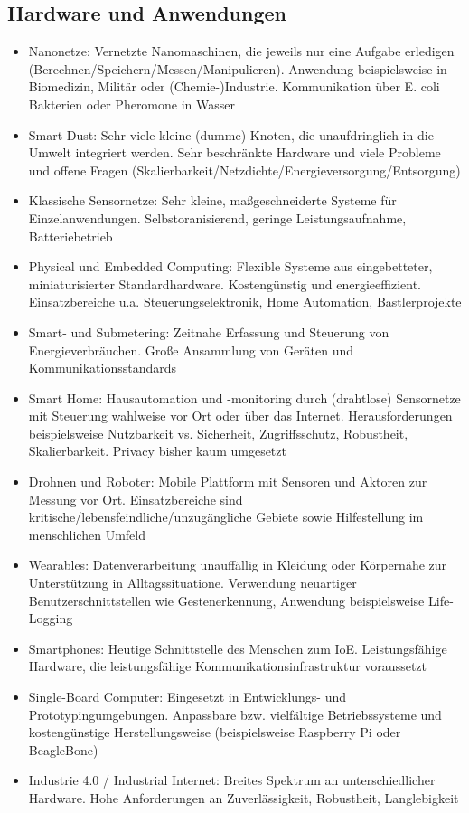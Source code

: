 \subsection{Hardware und Anwendungen}
\begin{itemize}
	\item Nanonetze: Vernetzte Nanomaschinen, die jeweils nur eine Aufgabe erledigen (Berechnen/Speichern/Messen/Manipulieren). Anwendung beispielsweise in Biomedizin, Militär oder (Chemie-)Industrie. Kommunikation über E. coli Bakterien oder Pheromone in Wasser
	\item Smart Dust: Sehr viele kleine (dumme) Knoten, die unaufdringlich in die Umwelt integriert werden. Sehr beschränkte Hardware und viele Probleme und offene Fragen (Skalierbarkeit/Netzdichte/Energieversorgung/Entsorgung)
	\item Klassische Sensornetze: Sehr kleine, maßgeschneiderte Systeme für Einzelanwendungen. Selbstoranisierend, geringe Leistungsaufnahme, Batteriebetrieb
	\item Physical und Embedded Computing: Flexible Systeme aus eingebetteter, miniaturisierter Standardhardware. Kostengünstig und energieeffizient. Einsatzbereiche u.a. Steuerungselektronik, Home Automation, Bastlerprojekte
	\item Smart- und Submetering: Zeitnahe Erfassung und Steuerung von Energieverbräuchen. Große Ansammlung von Geräten und Kommunikationsstandards
	\item Smart Home: Hausautomation und -monitoring durch (drahtlose) Sensornetze mit Steuerung wahlweise vor Ort oder über das Internet. Herausforderungen beispielsweise Nutzbarkeit vs. Sicherheit, Zugriffsschutz, Robustheit, Skalierbarkeit. Privacy bisher kaum umgesetzt
	\item Drohnen und Roboter: Mobile Plattform mit Sensoren und Aktoren zur Messung vor Ort. Einsatzbereiche sind kritische/lebensfeindliche/unzugängliche Gebiete sowie Hilfestellung im menschlichen Umfeld
	\item Wearables: Datenverarbeitung unauffällig in Kleidung oder Körpernähe zur Unterstützung in Alltagssituatione. Verwendung neuartiger Benutzerschnittstellen wie Gestenerkennung, Anwendung beispielsweise Life-Logging
	\item Smartphones: Heutige Schnittstelle des Menschen zum IoE. Leistungsfähige Hardware, die leistungsfähige Kommunikationsinfrastruktur voraussetzt
	\item Single-Board Computer: Eingesetzt in Entwicklungs- und Prototypingumgebungen. Anpassbare bzw. vielfältige Betriebssysteme und kostengünstige Herstellungsweise (beispielsweise Raspberry Pi oder BeagleBone)
	\item Industrie 4.0 / Industrial Internet: Breites Spektrum an unterschiedlicher Hardware. Hohe Anforderungen an Zuverlässigkeit, Robustheit, Langlebigkeit
\end{itemize}


